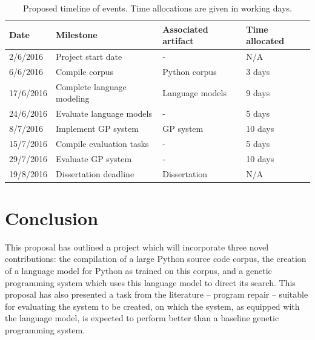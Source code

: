 \documentclass[a4paper,11pt]{proposal}
\begin{document}
\begin{table}[h!]
\begin{center}
    \begin{tabular}{ l l l l }
    \textbf{Date} & \textbf{Milestone} & \textbf{Associated artifact} & \textbf{Time allocated} \\ \hline
    2/6/2016  & Project start date & - & N/A \\ \hline
    6/6/2016  & Compile corpus & Python corpus & 3 days \\ \hline
    17/6/2016 & Complete language modeling & Language models & 9 days \\ \hline
    24/6/2016 & Evaluate language models & - & 5 days \\  \hline
    8/7/2016 & Implement GP system & GP system & 10 days \\  \hline
    15/7/2016 & Compile evaluation tasks & - & 5 days\\  \hline
    29/7/2016 & Evaluate GP system & - & 10 days \\  \hline
    19/8/2016 & Dissertation deadline & Dissertation & N/A\footnotemark  \\  \hline
    \end{tabular}
    \caption{Proposed timeline of events. Time allocations are given in working days.}
    \label{table:1}
\end{center}
\end{table}

\section{Conclusion}
This proposal has outlined a project which will incorporate three novel contributions: the compilation of a large Python source code corpus, the creation of a language model for Python as trained on this corpus, and a genetic programming system which uses this language model to direct its search. This proposal has also presented a task from the literature -- program repair -- suitable for evaluating the system to be created, on which the system, as equipped with the language model, is expected to perform better than a baseline genetic programming system.

\newpage


\end{document}
